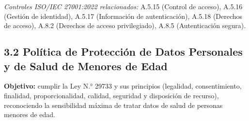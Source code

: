 \documentclass[11pt,a4paper]{article}
\begin{document}
\emph{Controles ISO/IEC 27001:2022 relacionados:} A.5.15 (Control de acceso), A.5.16 (Gestión de identidad), A.5.17 (Información de autenticación), A.5.18 (Derechos de acceso), A.8.2 (Derechos de acceso privilegiado), A.8.5 (Autenticación segura).

\subsection{3.2 Política de Protección de Datos Personales y de Salud de Menores de Edad}\label{poluxedtica-de-protecciuxf3n-de-datos-personales-y-de-salud-de-menores-de-edad}

\textbf{Objetivo:} cumplir la Ley N.° 29733 y sus principios (legalidad, consentimiento, finalidad, proporcionalidad, calidad, seguridad y disposición de recurso), reconociendo la sensibilidad máxima de tratar datos de salud de personas menores de edad.
\end{document}
